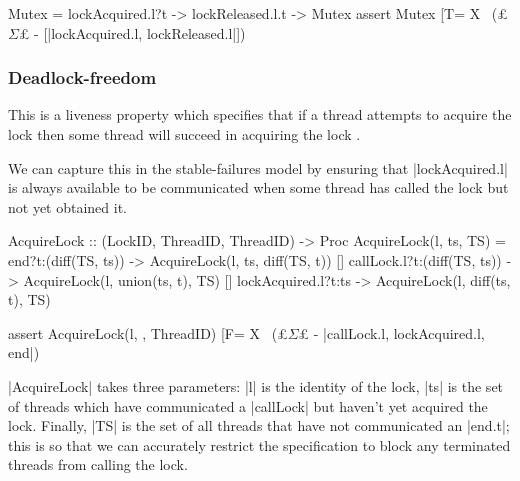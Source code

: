   
  \begin{cspm}
    Mutex = lockAcquired.l?t -> lockReleased.l.t -> Mutex
    assert Mutex [T= 
              X \ (£$\Sigma$£ - [|lockAcquired.l, lockReleased.l|])
  \end{cspm}

\subsubsection{Deadlock-freedom}\label{deadlock-freedom}
This is a liveness property which specifies that if a thread attempts to acquire the lock then some thread will succeed in acquiring the lock \cite{TAoMP}. 

  
  

  We can capture this in the stable-failures model by ensuring that |lockAcquired.l| is always available to be communicated when some thread has called the lock but not yet obtained it. %

  \begin{cspm}
AcquireLock :: (LockID, {ThreadID}, {ThreadID}) -> Proc
AcquireLock(l, ts, TS) = 
     end?t:(diff(TS, ts)) -> AcquireLock(l, ts, diff(TS, {t})) 
  [] callLock.l?t:(diff(TS, ts)) -> AcquireLock(l, union(ts, {t}), TS)
  [] lockAcquired.l?t:ts -> AcquireLock(l, diff(ts, {t}), TS)

assert AcquireLock(l, {}, ThreadID) [F= 
          X \ (£$\Sigma$£ - {|callLock.l, lockAcquired.l, end|})
  \end{cspm}
  |AcquireLock| takes three parameters: |l| is the identity of the lock, |ts| is the set of threads which have communicated a |callLock| but haven't yet acquired the lock. Finally, |TS| is the set of all threads that have not communicated an |end.t|; this is so that we can accurately restrict the specification to block any terminated threads from calling the lock. 

